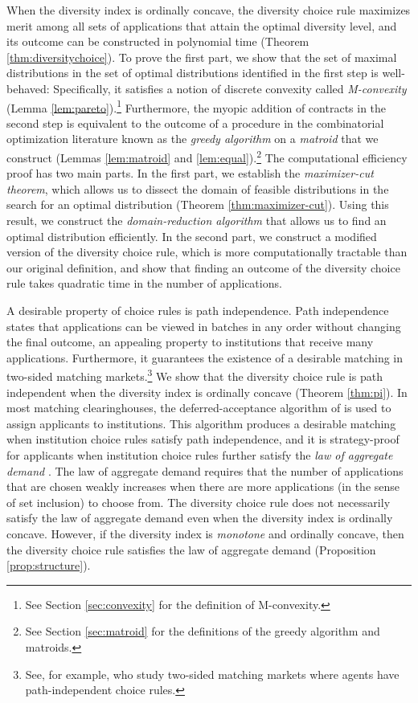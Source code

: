 \documentclass[12pt]{amsart}
\theoremstyle{remark}
\begin{document}
When the diversity index is ordinally concave, the diversity choice rule
maximizes merit among all sets of applications that attain the optimal diversity level,
and its outcome can be constructed in polynomial time (Theorem \ref{thm:diversitychoice}).
To prove the first part, we show that the set of maximal distributions in the set of optimal distributions
identified in the first step is well-behaved: Specifically, it satisfies a notion of discrete convexity called \emph{M-convexity} (Lemma \ref{lem:pareto}).\footnote{See Section \ref{sec:convexity} for the definition of M-convexity.} Furthermore,
the myopic addition of contracts in the second step is equivalent to the outcome of a procedure in the combinatorial optimization literature known as the
\emph{greedy algorithm} on a \emph{matroid} that we construct
(Lemmas \ref{lem:matroid} and \ref{lem:equal}).\footnote{See Section \ref{sec:matroid}
for the definitions of the
greedy algorithm and matroids.}
The computational efficiency proof has two main parts.
In the first part, we establish the \emph{maximizer-cut theorem}, which allows us
to dissect the domain of feasible distributions in the search for an optimal distribution
(Theorem \ref{thm:maximizer-cut}). Using this result, we construct the
\emph{domain-reduction algorithm} that
allows us to find an optimal distribution efficiently. In the second part, we construct
a modified version of the diversity choice rule, which is more computationally
tractable than our original definition, and show that finding an outcome of the diversity choice rule takes quadratic time in the number of applications.

A desirable property of choice rules is path independence. Path independence states that applications can be viewed
in batches in any order without changing the final outcome, an appealing property to
institutions that receive many applications. Furthermore, it
guarantees the existence of a desirable matching in two-sided matching markets.\footnote{See,
for example, \cite{chayen17} who study two-sided matching markets where agents have path-independent choice rules.}
We show that the diversity choice rule is path independent when the diversity index is ordinally concave (Theorem \ref{thm:pi}).
In most matching clearinghouses, the deferred-acceptance algorithm of \cite{gale62} is used to assign applicants to institutions.
This algorithm produces a desirable matching when institution choice rules satisfy path independence, and it
is strategy-proof for applicants when institution choice rules further satisfy the
\emph{law of aggregate demand} \citep{hatmil05}. The law of aggregate demand
requires that the number of applications that are chosen weakly increases when
there are more applications (in the sense of set inclusion) to choose from.
The diversity choice rule does not necessarily satisfy the law of aggregate demand
even when the diversity index is ordinally concave. However, if the diversity
index is \emph{monotone} and ordinally concave, then the diversity choice rule
satisfies the law of aggregate demand (Proposition \ref{prop:structure}).
\end{document}
